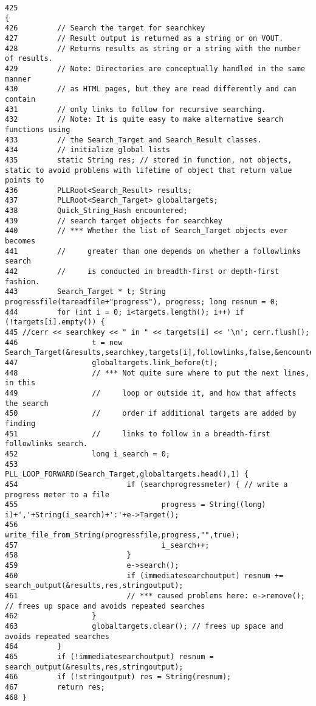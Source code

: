 \footnotesize\begin{verbatim}425                                                                                 {
426         // Search the target for searchkey
427         // Result output is returned as a string or on VOUT.
428         // Returns results as string or a string with the number of results.
429         // Note: Directories are conceptually handled in the same manner
430         // as HTML pages, but they are read differently and can contain
431         // only links to follow for recursive searching.
432         // Note: It is quite easy to make alternative search functions using
433         // the Search_Target and Search_Result classes.
434         // initialize global lists
435         static String res; // stored in function, not objects, static to avoid problems with lifetime of object that return value points to
436         PLLRoot<Search_Result> results;
437         PLLRoot<Search_Target> globaltargets;
438         Quick_String_Hash encountered;
439         // search target objects for searchkey
440         // *** Whether the list of Search_Target objects ever becomes
441         //     greater than one depends on whether a followlinks search
442         //     is conducted in breadth-first or depth-first fashion.
443         Search_Target * t; String progressfile(tareadfile+"progress"), progress; long resnum = 0;
444         for (int i = 0; i<targets.length(); i++) if (!targets[i].empty()) {
445 //cerr << searchkey << " in " << targets[i] << '\n'; cerr.flush();
446                 t = new Search_Target(&results,searchkey,targets[i],followlinks,false,&encountered);
447                 globaltargets.link_before(t);
448                 // *** Not quite sure where to put the next lines, in this
449                 //     loop or outside it, and how that affects the search
450                 //     order if additional targets are added by finding
451                 //     links to follow in a breadth-first followlinks search.
452                 long i_search = 0;
453                 PLL_LOOP_FORWARD(Search_Target,globaltargets.head(),1) {
454                         if (searchprogressmeter) { // write a progress meter to a file
455                                 progress = String((long) i)+','+String(i_search)+':'+e->Target();
456                                 write_file_from_String(progressfile,progress,"",true);
457                                 i_search++;
458                         }
459                         e->search();
460                         if (immediatesearchoutput) resnum += search_output(&results,res,stringoutput);
461                         // *** caused problems here: e->remove(); // frees up space and avoids repeated searches
462                 }
463                 globaltargets.clear(); // frees up space and avoids repeated searches
464         }
465         if (!immediatesearchoutput) resnum = search_output(&results,res,stringoutput);
466         if (!stringoutput) res = String(resnum);
467         return res;
468 }
\end{verbatim}\normalsize 
{}
